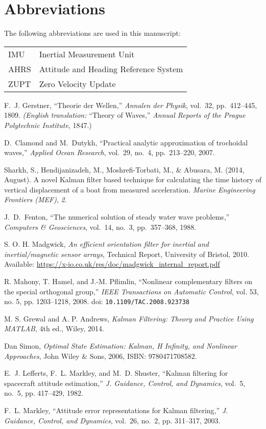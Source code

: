 \documentclass[11pt,letterpaper]{article}
\begin{document}
\section*{Abbreviations}
The following abbreviations are used in this manuscript:

\begin{tabular}{ll}
IMU & Inertial Measurement Unit \\
AHRS & Attitude and Heading Reference System \\
ZUPT & Zero Velocity Update \\
\end{tabular}

\begin{thebibliography}{20}

F.~J. Gerstner, ``Theorie der Wellen,'' 
\emph{Annalen der Physik}, vol.~32, pp.~412–445, 1809.  
\emph{(English translation: }``Theory of Waves,'' \emph{Annual Reports of the Prague Polytechnic Institute}, 1847.)

D.~Clamond and M.~Dutykh, ``Practical analytic approximation of trochoidal waves,'' 
\emph{Applied Ocean Research}, vol.~29, no.~4, pp.~213–220, 2007.

Sharkh, S., Hendijanizadeh, M., Moshrefi-Torbati, M., \& Abusara, M. (2014, August). 
A novel Kalman filter based technique for calculating the time history of vertical displacement of a boat from measured acceleration. 
\textit{Marine Engineering Frontiers (MEF)}, \textit{2}.

J.~D.~Fenton, “The numerical solution of steady water wave problems,” \emph{Computers \& Geosciences}, vol.~14, no.~3, pp.~357–368, 1988.

S. O. H. Madgwick,  
\textit{An efficient orientation filter for inertial and inertial/magnetic sensor arrays},  
Technical Report, University of Bristol, 2010.  
Available: \url{https://x-io.co.uk/res/doc/madgwick_internal_report.pdf}

R. Mahony, T. Hamel, and J.-M. Pflimlin,  
``Nonlinear complementary filters on the special orthogonal group,''  
\textit{IEEE Transactions on Automatic Control}, vol. 53, no. 5, pp. 1203--1218, 2008.  
doi: \texttt{10.1109/TAC.2008.923738}

M. S. Grewal and A. P. Andrews,  
\textit{Kalman Filtering: Theory and Practice Using MATLAB},  
4th ed., Wiley, 2014.

Dan Simon,
\textit{Optimal State Estimation: Kalman, H Infinity, and Nonlinear Approaches},
John Wiley \& Sons, 2006,
ISBN: 9780471708582.

E.~J. Lefferts, F.~L. Markley, and M.~D. Shuster, “Kalman filtering for spacecraft attitude estimation,” \emph{J. Guidance, Control, and Dynamics}, vol.~5, no.~5, pp. 417–429, 1982.

F.~L. Markley, “Attitude error representations for Kalman filtering,” \emph{J. Guidance, Control, and Dynamics}, vol.~26, no.~2, pp. 311–317, 2003.

\end{thebibliography}
\end{document}

